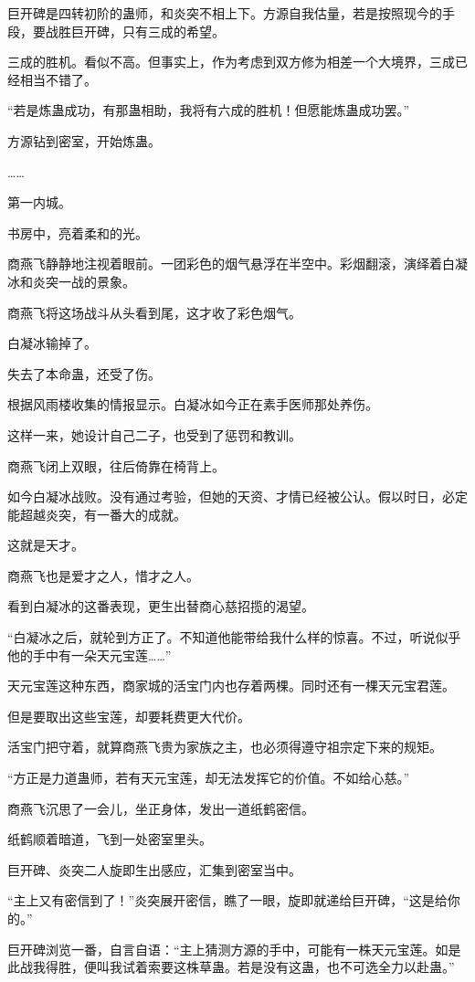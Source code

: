 \begin{this_body}
巨开碑是四转初阶的蛊师，和炎突不相上下。方源自我估量，若是按照现今的手段，要战胜巨开碑，只有三成的希望。

三成的胜机。看似不高。但事实上，作为考虑到双方修为相差一个大境界，三成已经相当不错了。

“若是炼蛊成功，有那蛊相助，我将有六成的胜机！但愿能炼蛊成功罢。”

方源钻到密室，开始炼蛊。

……

第一内城。

书房中，亮着柔和的光。

商燕飞静静地注视着眼前。一团彩色的烟气悬浮在半空中。彩烟翻滚，演绎着白凝冰和炎突一战的景象。

商燕飞将这场战斗从头看到尾，这才收了彩色烟气。

白凝冰输掉了。

失去了本命蛊，还受了伤。

根据风雨楼收集的情报显示。白凝冰如今正在素手医师那处养伤。

这样一来，她设计自己二子，也受到了惩罚和教训。

商燕飞闭上双眼，往后倚靠在椅背上。

如今白凝冰战败。没有通过考验，但她的天资、才情已经被公认。假以时日，必定能超越炎突，有一番大的成就。

这就是天才。

商燕飞也是爱才之人，惜才之人。

看到白凝冰的这番表现，更生出替商心慈招揽的渴望。

“白凝冰之后，就轮到方正了。不知道他能带给我什么样的惊喜。不过，听说似乎他的手中有一朵天元宝莲……”

天元宝莲这种东西，商家城的活宝门内也存着两棵。同时还有一棵天元宝君莲。

但是要取出这些宝莲，却要耗费更大代价。

活宝门把守着，就算商燕飞贵为家族之主，也必须得遵守祖宗定下来的规矩。

“方正是力道蛊师，若有天元宝莲，却无法发挥它的价值。不如给心慈。”

商燕飞沉思了一会儿，坐正身体，发出一道纸鹤密信。

纸鹤顺着暗道，飞到一处密室里头。

巨开碑、炎突二人旋即生出感应，汇集到密室当中。

“主上又有密信到了！”炎突展开密信，瞧了一眼，旋即就递给巨开碑，“这是给你的。”

巨开碑浏览一番，自言自语：“主上猜测方源的手中，可能有一株天元宝莲。如是此战我得胜，便叫我试着索要这株草蛊。若是没有这蛊，也不可选全力以赴蛊。”


\end{this_body}
